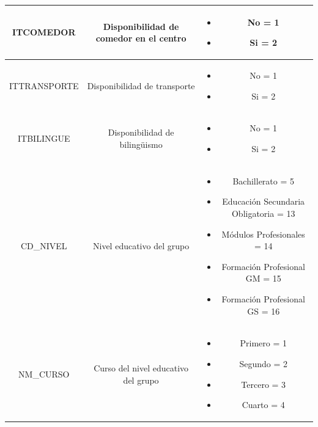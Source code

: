 \begin{subappendices}
\begin{table}[!ht]
{\begin{tabular}{|c|c|c|}
			\hline 
			ITCOMEDOR & Disponibilidad de comedor en el centro &  		\begin{minipage}[t]{0.4\textwidth}
				\begin{itemize}
					\item No = 1
					\item Si = 2
				\end{itemize}
			\end{minipage}\\ 
			\hline 
			ITTRANSPORTE & Disponibilidad de transporte & \begin{minipage}[t]{0.4\textwidth}
				\begin{itemize}
					\item No = 1
					\item Si = 2
				\end{itemize}
			\end{minipage}\\ 
			\hline 
			ITBILINGUE & Disponibilidad de bilingüismo & \begin{minipage}[t]{0.4\textwidth}
				\begin{itemize}
					\item No = 1
					\item Si = 2
				\end{itemize}
			\end{minipage}\\ 
			\hline 
			CD\_NIVEL & Nivel educativo del grupo &    
			\begin{minipage}[t]{0.4\textwidth}
				\begin{itemize}
					\item Bachillerato = 5
					\item Educación Secundaria Obligatoria = 13
					\item Módulos Profesionales = 14
					\item Formación Profesional GM = 15
					\item Formación Profesional GS = 16
				\end{itemize}
			\end{minipage}\\ 
			\hline 
			NM\_CURSO & Curso del nivel educativo del grupo &  
			\begin{minipage}[t]{0.4\textwidth}
				\begin{itemize}
					\item Primero = 1
					\item Segundo = 2
					\item Tercero = 3
					\item Cuarto = 4

\end{itemize}
\end{minipage}
\end{tabular}}
\end{table}
\end{subappendices}
